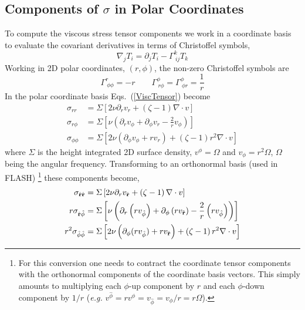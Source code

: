 \subsection{Components of $\sigma$ in Polar Coordinates}
To compute the viscous stress tensor components we work in a coordinate basis to evaluate the covariant derivatives in terms of Christoffel symbols,
\begin{equation}
\nabla_j T_i = \partial_j T_i - \Gamma^k_{\ ij}T_k \nonumber
\end{equation} 
Working in 2D polar coordinates, $(r, \phi)$, the non-zero Christoffel symbols are
\begin{equation}
 \Gamma^r_{\ \phi \phi} = -r \qquad  \Gamma^{\phi}_{\ r \phi}=\Gamma^{\phi}_{\  \phi r} = \frac{1}{r} \nonumber
\end{equation} 
In the polar coordinate basis Eqs.\ (\ref{ViscTensor}) become
\begin{align}
\sigma_{rr} &= \Sigma \left[ 2 \nu \partial_r v_r + \left( \zeta -1 \right) \nabla \cdot v \right]   \nonumber \\
\sigma_{r \phi} &= \Sigma \left[  \nu \left( \partial_r v_{\phi} + \partial_{\phi}v_r  - \frac{2}{r} v_{\phi} \right) \right] \nonumber \\
\sigma_{\phi \phi} &= \Sigma \left[ 2 \nu \left(\partial_{\phi} v_{\phi} + r v_r \right) + \left( \zeta - 1\right) r^2 \nabla \cdot v \right]  \nonumber 
\end{align}
where $\Sigma$ is the height integrated 2D surface density, $v^{\phi}=\Omega$ and $v_{\phi}= r^2 \Omega$, $\Omega$ being the angular frequency.
Transforming to an orthonormal basis (used in FLASH)
%
\footnote{For this conversion one needs to contract the coordinate tensor components with the orthonormal components of the coordinate basis vectors. This simply amounts to multiplying each $\phi$-up component by $r$ and each $\phi$-down component by $1/r$ (\textit{e.g.} $v^{\hat{\phi}} = r v^{\phi} = v_{\hat{\phi}} = v_{\phi}/r = r \Omega$).}
%
these components become,
\begin{align}
\sigma_{\hat {\bf r} \hat {\bf r}} &= \Sigma \left[ 2 \nu \partial_r v_{\hat {\bf r}} + \left( \zeta -1 \right) \nabla \cdot v \right]  \nonumber \\
r \sigma_{\hat {\bf r} {\hat{\phi}}} &= \Sigma \left[  \nu \left( \partial_r \left(r v_{{\hat{\phi}}} \right)+ \partial_{\phi}\left(r v_{\hat {\bf r}} \right) - \frac{2}{r}\left( r v_{{\hat{\phi}}} \right) \right) \right]  \nonumber \\
r^2 \sigma_{{\hat{\phi}} {\hat{\phi}}} &=  \Sigma \left[ 2 \nu \left(\partial_{\phi}(r v_{{\hat{\phi}}}) + r v_{\hat {\bf r}} \right) + \left( \zeta - 1 \right) r^2 \nabla \cdot v \right]  \nonumber 
\end{align}
